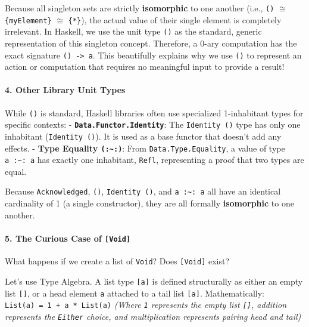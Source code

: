 \documentclass[
]{article}
\begin{document}
Because all singleton sets are strictly \textbf{isomorphic} to one
another (i.e., \texttt{()} \(\cong\) \texttt{\{myElement\}} \(\cong\)
\texttt{\{*\}}), the actual value of their single element is completely
irrelevant. In Haskell, we use the unit type \texttt{()} as the
standard, generic representation of this singleton concept. Therefore, a
0-ary computation has the exact signature
\texttt{()\ -\textgreater{}\ a}. This beautifully explains why we use
\texttt{()} to represent an action or computation that requires no
meaningful input to provide a result!

\paragraph{4. Other Library Unit Types}\label{other-library-unit-types}

While \texttt{()} is standard, Haskell libraries often use specialized
1-inhabitant types for specific contexts: -
\textbf{\texttt{Data.Functor.Identity}}: The \texttt{Identity\ ()} type
has only one inhabitant (\texttt{Identity\ ()}). It is used as a base
functor that doesn't add any effects. - \textbf{Type Equality
\texttt{(:\textasciitilde{}:)}}: From \texttt{Data.Type.Equality}, a
value of type \texttt{a\ :\textasciitilde{}:\ a} has exactly one
inhabitant, \texttt{Refl}, representing a proof that two types are
equal.

Because \texttt{Acknowledged}, \texttt{()}, \texttt{Identity\ ()}, and
\texttt{a\ :\textasciitilde{}:\ a} all have an identical cardinality of
1 (a single constructor), they are all formally \textbf{isomorphic} to
one another.

\paragraph{\texorpdfstring{5. The Curious Case of
\texttt{{[}Void{]}}}{5. The Curious Case of {[}Void{]}}}\label{the-curious-case-of-void}

What happens if we create a list of \texttt{Void}? Does
\texttt{{[}Void{]}} exist?

Let's use Type Algebra. A list type \texttt{{[}a{]}} is defined
structurally as either an empty list \texttt{{[}{]}}, or a head element
\texttt{a} attached to a tail list \texttt{{[}a{]}}. Mathematically:
\texttt{List(a)\ =\ 1\ +\ a\ *\ List(a)} \emph{(Where \texttt{1}
represents the empty list \texttt{{[}{]}}, addition represents the
\texttt{Either} choice, and multiplication represents pairing head and
tail)}
\end{document}
